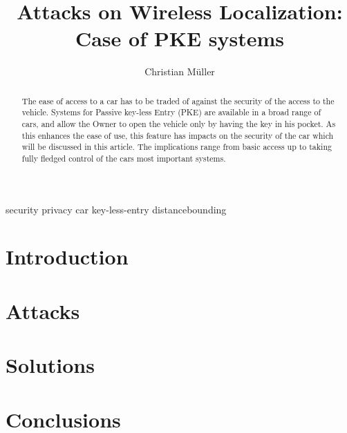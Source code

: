 \documentclass[draft,a4paper]{IEEEtran}
\title{Attacks on Wireless Localization:\\Case of PKE systems}
\author{Christian Müller}
\begin{document}
\maketitle
\begin{IEEEkeywords}
security privacy car key-less-entry distancebounding
\end{IEEEkeywords}


\begin{abstract}
The ease of access to a car has to be traded of against the security of the
access to the vehicle.
Systems for Passive key-less Entry (PKE) are available in a broad range of cars,
and allow the Owner to open the vehicle only by having the key in his pocket.
As this enhances the ease of use, this feature has impacts on the security of
the car which will be discussed in this article. The implications range from 
basic access up to taking fully fledged control of the cars most important
systems.
\end{abstract}

\section{Introduction}
	

\section{Attacks}
	

\section{Solutions}


\section{Conclusions}
\end{document}
